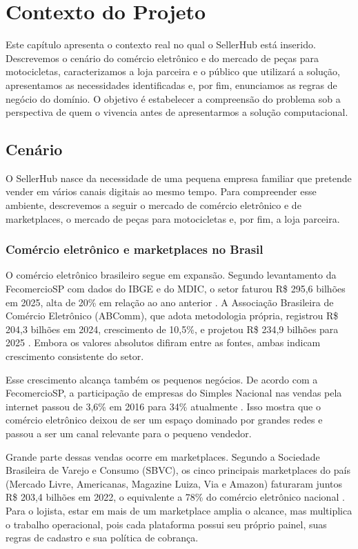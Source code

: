 \chapter{Contexto do Projeto}
\label{cap:contexto}

Este capítulo apresenta o contexto real no qual o SellerHub está inserido. Descrevemos o cenário do comércio eletrônico e do mercado de peças para motocicletas, caracterizamos a loja parceira e o público que utilizará a solução, apresentamos as necessidades identificadas e, por fim, enunciamos as regras de negócio do domínio. O objetivo é estabelecer a compreensão do problema sob a perspectiva de quem o vivencia antes de apresentarmos a solução computacional.

\section{Cenário}
\label{sec:cenario}

O SellerHub nasce da necessidade de uma pequena empresa familiar que pretende vender em vários canais digitais ao mesmo tempo. Para compreender esse ambiente, descrevemos a seguir o mercado de comércio eletrônico e de marketplaces, o mercado de peças para motocicletas e, por fim, a loja parceira.

\subsection{Comércio eletrônico e marketplaces no Brasil}

O comércio eletrônico brasileiro segue em expansão. Segundo levantamento da FecomercioSP com dados do IBGE e do MDIC, o setor faturou R\$ 295,6 bilhões em 2025, alta de 20\% em relação ao ano anterior \cite{fecomercio2026}. A Associação Brasileira de Comércio Eletrônico (ABComm), que adota metodologia própria, registrou R\$ 204,3 bilhões em 2024, crescimento de 10,5\%, e projetou R\$ 234,9 bilhões para 2025 \cite{abcomm2025}. Embora os valores absolutos difiram entre as fontes, ambas indicam crescimento consistente do setor.

Esse crescimento alcança também os pequenos negócios. De acordo com a FecomercioSP, a participação de empresas do Simples Nacional nas vendas pela internet passou de 3,6\% em 2016 para 34\% atualmente \cite{fecomercio2026}. Isso mostra que o comércio eletrônico deixou de ser um espaço dominado por grandes redes e passou a ser um canal relevante para o pequeno vendedor.

Grande parte dessas vendas ocorre em marketplaces. Segundo a Sociedade Brasileira de Varejo e Consumo (SBVC), os cinco principais marketplaces do país (Mercado Livre, Americanas, Magazine Luiza, Via e Amazon) faturaram juntos R\$ 203,4 bilhões em 2022, o equivalente a 78\% do comércio eletrônico nacional \cite{sbvc2023}. Para o lojista, estar em mais de um marketplace amplia o alcance, mas multiplica o trabalho operacional, pois cada plataforma possui seu próprio painel, suas regras de cadastro e sua política de cobrança.

